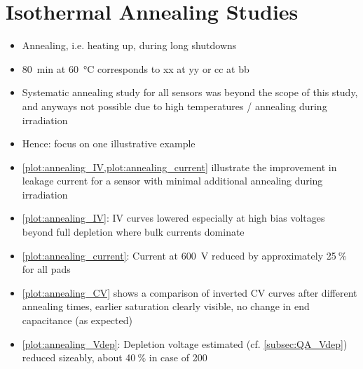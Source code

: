 \section{Isothermal Annealing Studies}
\label{sec:annealing}

\begin{itemize}
	\item Annealing, i.e. heating up, during long shutdowns
	\item \SI{80}{\minute} at \SI{60}{\celsius} corresponds to xx at yy or cc at bb
	\item Systematic annealing study for all sensors was beyond the scope of this study, and anyways not possible due to high temperatures / annealing during irradiation
	\item Hence: focus on one illustrative example
	\item \ref{plot:annealing_IV,plot:annealing_current} illustrate the improvement in leakage current for a sensor with minimal additional annealing during irradiation
	\item \ref{plot:annealing_IV}: IV curves lowered especially at high bias voltages beyond full depletion where bulk currents dominate
	\item \ref{plot:annealing_current}: Current at \SI{600}{\volt} reduced by approximately 25$~\%$ for all pads
	\item \ref{plot:annealing_CV} shows a comparison of inverted CV curves after different annealing times, earlier saturation clearly visible, no change in end capacitance (as expected)
	\item \ref{plot:annealing_Vdep}: Depletion voltage estimated (cf. \ref{subsec:QA_Vdep}) reduced sizeably, about 40$~\%$ in case of \SI{200}{\micron}
\end{itemize}

